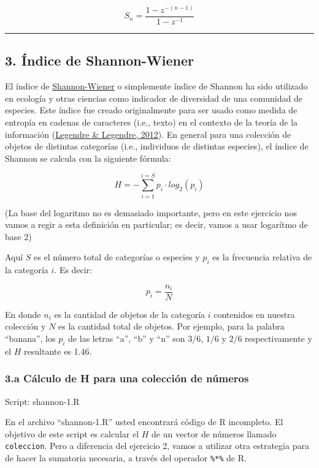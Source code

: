 \documentclass[]{article}
\begin{document}
\[
  S_n = \frac{1 - z ^ {- (n - 1)}}{1 - z ^ {-1}}
\]

\begin{center}\rule{3in}{0.4pt}\end{center}

\subsection{3. Índice de Shannon-Wiener}

El índice de
\href{https://es.wikipedia.org/wiki/\%C3\%8Dndice\_de\_Shannon}{Shannon-Wiener}
o simplemente índice de Shannon ha sido utilizado en ecología y otras
ciencias como indicador de diversidad de una comunidad de especies. Este
índice fue creado originalmente para ser usado como medida de entropía
en cadenas de caracteres (i.e., texto) en el contexto de la teoría de la
información (\href{http://www.amazon.com/dp/0444538682}{Legendre \&
Legendre, 2012}). En general para una colección de objetos de distintas
categorías (i.e., individuos de distintas especies), el índice de
Shannon se calcula con la siguiente fórmula:

\[
  H = - \sum_{i=1}^{i=S} p_i \cdot log_2 (p_i)
\]

(La base del logaritmo no es demasiado importante, pero en este
ejercicio nos vamos a regir a esta definición en particular; es decir,
vamos a usar logarítmo de base 2)

Aquí $S$ es el número total de categorías o especies y $p_i$ es la
frecuencia relativa de la categoría $i$. Es decir:

\[
  p_i = \frac{n_i}{N}
\]

En donde $n_i$ es la cantidad de objetos de la categoría $i$ contenidos
en nuestra colección y $N$ es la cantidad total de objetos. Por ejemplo,
para la palabra ``banana'', los $p_i$ de las letras ``a'', ``b'' y ``n''
son $3/6$, $1/6$ y $2/6$ respectivamente y el $H$ resultante es 1.46.

\subsubsection{3.a Cálculo de H para una colección de números}

Script: shannon-1.R

En el archivo ``shannon-1.R'' usted encontrará código de R incompleto.
El objetivo de este script es calcular el $H$ de un vector de números
llamado \texttt{coleccion}. Pero a diferencia del ejercicio 2, vamos a
utilizar otra estrategia para de hacer la sumatoria necesaria, a través
del operador \texttt{\%*\%} de R.
\end{document}
